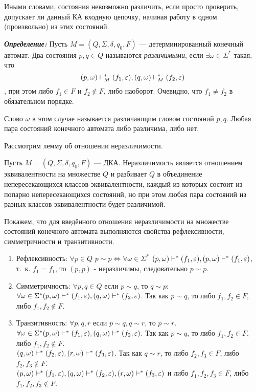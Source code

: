 Иными словами, состояния невозможно различить, если просто проверить, допускает ли данный КА входную цепочку, начиная работу в одном (произвольно) из этих состояний.

\textit{\textbf{Определение:}} Пусть $M = (Q,\Sigma, \delta, q_0, F)$ --- детерминированный конечный автомат. Два состояния $p, q \in Q$ называются \textit{различимыми}, если $\exists \omega \in \Sigma^*$ такая, что \[ (p, \omega) \vdash_M^* (f_1, \varepsilon), (q, \omega) \vdash_M^* (f_2, \varepsilon) \], при этом либо $f_1 \in F$ и $f_2 \notin F$, либо наоборот. Очевидно, что $f_1 \neq f_2$ в обязательном порядке.

Слово $\omega$ в этом случае называется различающим словом состояний $p, q$. Любая пара состояний конечного автомата либо различима, либо нет.

Рассмотрим лемму об отношении неразличимости.
\begin{mylemma}
Пусть $M = (Q,\Sigma, \delta, q_0, F)$ --- ДКА. Неразличимость является отношением эквивалентности на множестве $Q$ и разбивает $Q$ в объединение непересекающихся классов эквивалентности, каждый из которых состоит из попарно непересекающихся состояний, но при этом любая пара состояний из разных классов эквивалентности будет различимой.
\end{mylemma}
\begin{myproof}
Покажем, что для введённого отношения неразличимости на множестве состояний конечного автомата выполняются свойства рефлексивности, симметричности и транзитивности.
\begin{enumerate}
\item Рефлексивность: $\forall p \in Q$ $p \sim p \Leftrightarrow \forall \omega \in \Sigma^*$ $ (p, \omega) \vdash^* (f_1, \varepsilon), (p, \omega) \vdash^* (f_1, \varepsilon) $, т.~к. $f_1 = f_1$, то $(p, p)$ - неразличимы, следовательно $p \sim p$.
\item Симметричность: $\forall p, q \in Q$ если $p \sim q$, то $q \sim p$: \\
$\forall \omega \in \Sigma^* (p, \omega) \vdash^* (f_1, \varepsilon), (q, \omega) \vdash^* (f_2, \varepsilon) $. Так как $p \sim q$, то либо $f_1, f_2 \in F$, либо $f_1, f_2 \notin F$.
\item Транзитивность: $\forall p, q, r$ если $p \sim q, q \sim r$, то $p \sim r$.\\ $\forall \omega \in \Sigma^* (p, \omega) \vdash^* (f_1, \varepsilon), (q, \omega) \vdash^* (f_2, \varepsilon) $.
Так как $p \sim q$, то либо $f_1, f_2 \in F$, либо $f_1, f_2 \notin F$. \\
$ (q, \omega) \vdash^* (f_2, \varepsilon), (r, \omega) \vdash^* (f_3, \varepsilon) $.
Так как $q \sim r$, то либо $f_2, f_3 \in F$, либо $f_2, f_3 \notin F$. \\
$ (p, \omega) \vdash^* (f_1, \varepsilon), (q, \omega) \vdash^* (f_2, \varepsilon), (r, \omega) \vdash^* (f_3, \varepsilon) $
и либо $f_1, f_2, f_3 \in F$, либо $f_1, f_2, f_3 \notin F$.
\end{enumerate}
\end{myproof}


